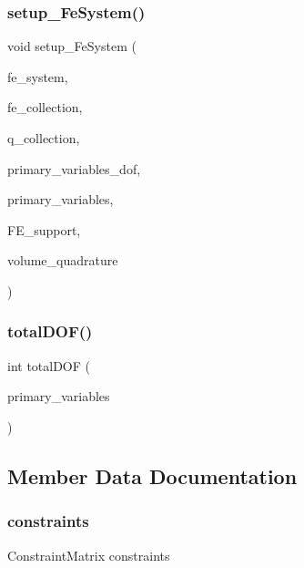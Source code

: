 \subsubsection{\texorpdfstring{setup\_FeSystem()}{setup\_FeSystem()}}
{\footnotesize\ttfamily void setup\+\_\+\+Fe\+System (\begin{DoxyParamCaption}\item[{std\+::vector$<$ std\+::shared\+\_\+ptr$<$ F\+E\+System$<$ dim $>$$>$ $>$ \&}]{fe\+\_\+system,  }\item[{hp\+::\+F\+E\+Collection$<$ dim $>$ \&}]{fe\+\_\+collection,  }\item[{hp\+::\+Q\+Collection$<$ dim $>$ \&}]{q\+\_\+collection,  }\item[{std\+::vector$<$ unsigned int $>$ \&}]{primary\+\_\+variables\+\_\+dof,  }\item[{std\+::vector$<$ std\+::vector$<$ std\+::string $>$ $>$ \&}]{primary\+\_\+variables,  }\item[{std\+::vector$<$ std\+::vector$<$ int $>$ $>$ \&}]{F\+E\+\_\+support,  }\item[{const Q\+Gauss$<$ dim $>$ \&}]{volume\+\_\+quadrature }\end{DoxyParamCaption})}

\mbox{\label{classhp_f_e_m_a9ceee3881af75e3be863fdb2d1688c0e}} 
\subsubsection{\texorpdfstring{totalDOF()}{totalDOF()}}
{\footnotesize\ttfamily int total\+D\+OF (\begin{DoxyParamCaption}\item[{std\+::vector$<$ std\+::vector$<$ std\+::string $>$ $>$ \&}]{primary\+\_\+variables }\end{DoxyParamCaption})}



\subsection{Member Data Documentation}
\mbox{\label{classhp_f_e_m_aa08dcec4445eed1687b99cdb7b24b785}} 
\subsubsection{\texorpdfstring{constraints}{constraints}}
{\footnotesize\ttfamily Constraint\+Matrix constraints}

